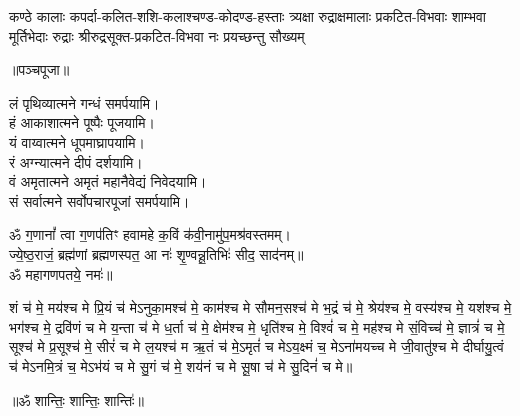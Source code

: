 {कण्ठे कालाः कपर्दा-कलित-शशि-कलाश्चण्ड-कोदण्ड-हस्ताः}
{त्र्यक्षा रुद्राक्षमालाः प्रकटित-विभवाः शाम्भवा मूर्तिभेदाः}
{रुद्राः श्रीरुद्रसूक्त-प्रकटित-विभवा नः प्रयच्छन्तु सौख्यम्}
\endgroup

\centerline{॥पञ्चपूजा॥}

लं पृथिव्यात्मने गन्धं समर्पयामि।\\
हं आकाशात्मने पूष्पैः पूजयामि।\\
यं वाय्वात्मने धूपमाघ्रापयामि।\\
रं अग्न्यात्मने दीपं दर्शयामि।\\
वं अमृतात्मने अमृतं महानैवेद्यं निवेदयामि।\\
सं सर्वात्मने सर्वोपचारपूजां समर्पयामि।

ॐ ग॒णानां᳚ त्वा ग॒णप॑तिꣳ हवामहे क॒विं क॑वी॒नामु॑प॒\-मश्र॑वस्तमम्।\\
ज्ये॒ष्ठ॒राजं॒ ब्रह्म॑णां ब्रह्मणस्पत॒ आ नः॑ शृ॒ण्वन्नू॒तिभिः॑ सीद॒ साद॑नम्॥\\
ॐ महागणपतये॒ नमः॑॥

शं च॑ मे॒ मय॑श्च मे प्रि॒यं च॑ मेऽनुका॒मश्च॑ मे॒ काम॑श्च मे सौमन॒सश्च॑ मे भ॒द्रं च॑ मे॒ श्रेय॑श्च मे॒ वस्य॑श्च मे॒ यश॑श्च मे॒ भग॑श्च मे॒ द्रवि॑णं च मे य॒न्ता च॑ मे ध॒र्ता च॑ मे॒ क्षेम॑श्च मे॒ धृति॑श्च मे॒ विश्वं॑ च मे॒ मह॑श्च मे सं॒विच्च॑ मे॒ ज्ञात्रं॑ च मे॒ सूश्च॑ मे प्र॒सूश्च॑ मे॒ सीरं॑ च मे ल॒यश्च॑ म ऋ॒तं च॑ मे॒ऽमृतं॑ च मेऽय॒क्ष्मं च॒ मेऽना॑मयच्च मे जी॒वातु॑श्च मे दीर्घायु॒त्वं च॑ मेऽनमि॒त्रं च॒ मेऽभ॑यं च मे सु॒गं च॑ मे॒ शय॑नं च मे सू॒षा च॑ मे सु॒दिनं॑ च मे॥
\centerline{॥ॐ शान्तिः॒ शान्तिः॒ शान्तिः॑॥}

\newcommand{\cham}[3]{\begin{center}
  \refstepcounter{cj}%
धूपम्। दीपम्। नैवेद्यम्। कर्पूरताम्बूलम्।\\
नीराजनम्—\\
#1\\
अनेन \textbf{#2}-वार-जपेन भगवान् सर्वात्मकः\\
\underline{\textbf{#3}} सुप्रीतः सुप्रसन्नो वरदो भवतु॥\devanumber{\arabic{cj}}॥

{\small\closesection}
\end{center}}

\newcommand{\rudram}[1]{\newpage\sect{रुद्रप्रश्नः}
\begin{center}

ॐ नमो भगवते॑ रुद्रा॒य॥\\
नम॑स्ते रुद्र म॒न्यव॑ उ॒तो त॒ इष॑वे॒ नमः॑।
% 
$\ldots$\\
#1\\
$\ldots$\\

त्र्य॑म्बकं यजामहे सुग॒न्धिं पु॑ष्टि॒वर्ध॑नम्।\\ उ॒र्वा॒रु॒कमि॑व॒ बन्ध॑नान्मृ॒त्योर्मु॑क्षीय॒ माऽमृता᳚त्॥
\end{center}
}


